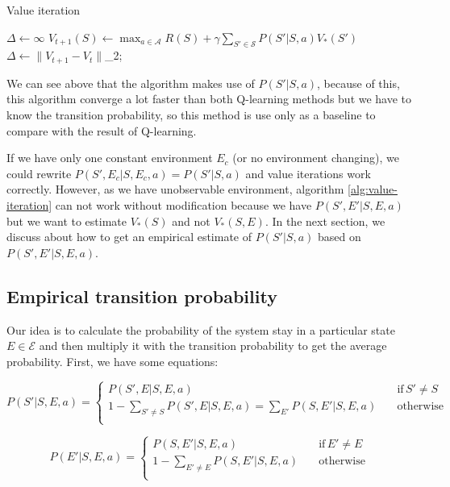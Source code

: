 \documentclass[
  a4paper, xcolor = usenames,dvipsnames]{article}
\begin{document}
\begin{algorithm}
\caption{Value iteration} \label{alg:value-iteration}
$\Delta \gets \infty$\;
\While {\Delta > \epsilon} {
   {
    $V_{t+1}(S) \gets \max_{a \in \mathcal{A}} R(S) + \gamma \sum_{S' \in \mathcal{S}} P(S' | S, a) V_{*}(S')$\;
  }
  $\Delta \gets \lVert V_{t + 1} - V_{t} \rVert$\_{2};
}
\end{algorithm}

We can see above that the algorithm makes use of \(P(S' | S, a)\), because of this, this algorithm converge a lot faster than both Q-learning methods but we have to know the transition probability, so this method is use only as a baseline to compare with the result of Q-learning.

If we have only one constant environment \(E_{c}\) (or no environment changing), we could rewrite \(P(S', E_{c} | S, E_{c}, a) = P(S' | S, a)\) and value iterations work correctly. However, as we have unobservable environment, algorithm \ref{alg:value-iteration} can not work without modification because we have \(P(S', E' | S, E, a)\) but we want to estimate \(V_{*}(S)\) and not \(V_{*}(S, E)\). In the next section, we discuss about how to get an empirical estimate of \(P(S'|S, a)\) based on \(P(S', E' | S, E, a)\).

\hypertarget{empirical-transition-probability}{%
\subsection{Empirical transition probability}\label{empirical-transition-probability}}

Our idea is to calculate the probability of the system stay in a particular state \(E \in \mathcal{E}\) and then multiply it with the transition probability to get the average probability. First, we have some equations:

\begin{equation}
  P(S'|S, E, a) = 
    \begin{cases}
        P(S', E|S, E, a) \quad & \text{if} \, S' \neq S \\
        1 - \sum_{S' \neq S} P(S', E|S, E, a) = \sum_{E'} P(S, E'|S, E, a) \quad & \text{otherwise} \\
    \end{cases}
\label{eq:p-s}
\end{equation}

\begin{equation}
  P(E'|S, E, a) = 
    \begin{cases}
        P(S, E'|S, E, a) \quad & \text{if} \, E' \neq E \\
        1 - \sum_{E' \neq E} P(S, E'|S, E, a) \quad & \text{otherwise} \\
    \end{cases}
\label{eq:p-e}
\end{equation}
\end{document}
